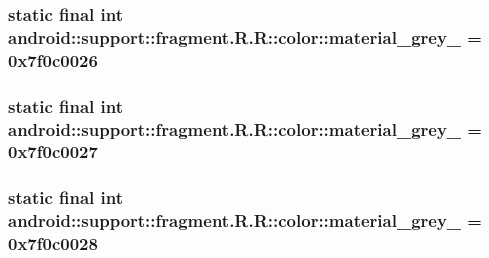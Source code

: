 \hypertarget{classandroid_1_1support_1_1fragment_1_1_r_1_1color_888b580382fcc28090cdbbae02359f2f}{
\subsubsection[{material\_\-grey\_\-50}]{\setlength{\rightskip}{0pt plus 5cm}static final int android::support::fragment.R.R::color::material\_\-grey\_ = 0x7f0c0026}}
\label{classandroid_1_1support_1_1fragment_1_1_r_1_1color_888b580382fcc28090cdbbae02359f2f}


\hypertarget{classandroid_1_1support_1_1fragment_1_1_r_1_1color_360a0f6c84d74babb8d7f37e69731826}{
\subsubsection[{material\_\-grey\_\-600}]{\setlength{\rightskip}{0pt plus 5cm}static final int android::support::fragment.R.R::color::material\_\-grey\_ = 0x7f0c0027}}
\label{classandroid_1_1support_1_1fragment_1_1_r_1_1color_360a0f6c84d74babb8d7f37e69731826}


\hypertarget{classandroid_1_1support_1_1fragment_1_1_r_1_1color_cebcf00d933c3909e524afd7dad6d20d}{
\subsubsection[{material\_\-grey\_\-800}]{\setlength{\rightskip}{0pt plus 5cm}static final int android::support::fragment.R.R::color::material\_\-grey\_ = 0x7f0c0028}}
\label{classandroid_1_1support_1_1fragment_1_1_r_1_1color_cebcf00d933c3909e524afd7dad6d20d}


